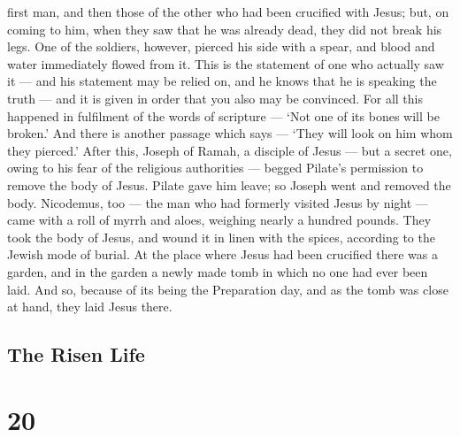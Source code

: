 first man, and then those of the other who had been crucified with
Jesus;  but, on coming to him, when they saw that he was
already dead, they did not break his legs.  One of the
soldiers, however, pierced his side with a spear, and blood and water
immediately flowed from it.  This is the statement of one
who actually saw it --- and his statement may be relied on, and he knows
that he is speaking the truth --- and it is given in order that you also
may be convinced.  For all this happened in fulfilment of
the words of scripture --- `Not one of its bones will be broken.'
 And there is another passage which says --- `They will
look on him whom they pierced.'  After this, Joseph of
Ramah, a disciple of Jesus --- but a secret one, owing to his fear of
the religious authorities --- begged Pilate's permission to remove the
body of Jesus. Pilate gave him leave; so Joseph went and removed the
body.  Nicodemus, too --- the man who had formerly visited
Jesus by night --- came with a roll of myrrh and aloes, weighing nearly
a hundred pounds.  They took the body of Jesus, and wound
it in linen with the spices, according to the Jewish mode of burial.
 At the place where Jesus had been crucified there was a
garden, and in the garden a newly made tomb in which no one had ever
been laid.  And so, because of its being the Preparation
day, and as the tomb was close at hand, they laid Jesus there.

\hypertarget{the-risen-life}{%
\subsection{The Risen Life}\label{the-risen-life}}

\hypertarget{section-19}{%
\section{20}\label{section-19}}

